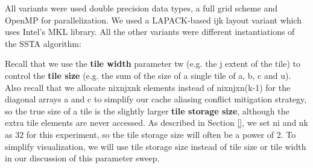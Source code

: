 \documentclass{sig-alternate-05-2015}
\begin{document}
All variants were used double precision data types, a full grid scheme and
OpenMP for parallelization. We used a LAPACK-based ijk layout variant which
uses Intel's MKL library. All the other variants were different instantiations
of the SSTA algorithm:


Recall that we use the \textbf{tile width} parameter tw (e.g. the j extent of
the tile) to control the \textbf{tile size} (e.g. the sum of the size of a
single tile of a, b, c and u). Also recall that we allocate nixnjxnk elements
instead of nixnjxn(k-1) for the diagonal arrays a and c to simplify our cache
aliasing conflict mitigation strategy, so the true size of a tile is the
slightly larger \textbf{tile storage size}, although the extra tile elements
are never accessed. As described in Section \ref{}, we set ni and nk as 32 for
this experiment, so the tile storage size will often be a power of 2. To
simplify visualization, we will use tile storage size instead of tile size or
tile width in our discussion of this parameter sweep.

\end{document}
